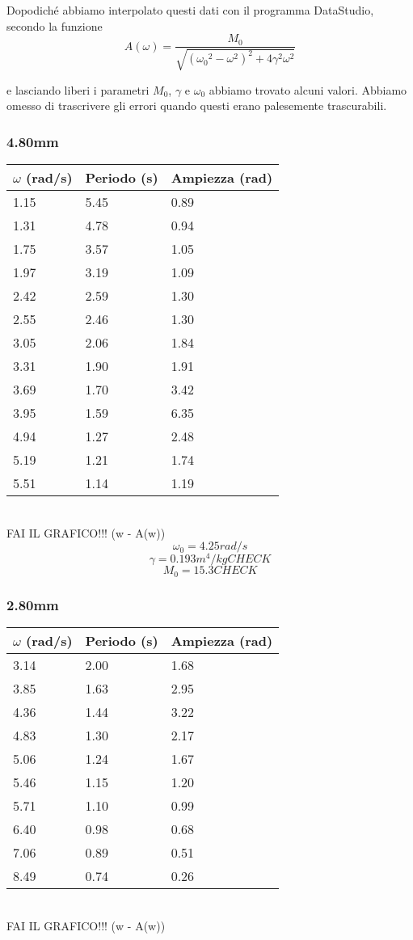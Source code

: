 \documentclass[a4paper,10pt]{report}
\begin{document}
Dopodiché abbiamo interpolato questi dati con il programma DataStudio, secondo la funzione
$$ A(\omega) = \frac{M_0}{\sqrt{ ({\omega_0}^2-\omega^2)^2 + 4\gamma^2\omega^2}} $$

e lasciando liberi i parametri $M_0$, $\gamma$ e $\omega_0$ abbiamo trovato alcuni valori. Abbiamo omesso di trascrivere gli errori quando questi erano palesemente trascurabili.
\\
\subsubsection{4.80mm}
\begin{tabular}{l|l|l}
$\omega$ (rad/s) & Periodo (s) & Ampiezza (rad) \\
\midrule
1.15	& 5.45 & 0.89\\
1.31	& 4.78 & 0.94\\
1.75	& 3.57 & 1.05\\
1.97	& 3.19 & 1.09\\
2.42	& 2.59 & 1.30\\
2.55	& 2.46 & 1.30\\
3.05    & 2.06 & 1.84\\
3.31	& 1.90 & 1.91\\
3.69	& 1.70 & 3.42\\
3.95	& 1.59 & 6.35\\
4.94	& 1.27 & 2.48\\
5.19	& 1.21 & 1.74\\
5.51	& 1.14 & 1.19 \\
\midrule
\end{tabular}
\\
FAI IL GRAFICO!!! (w - A(w))
\\

$$ \omega_0 = 4.25 rad/s $$
$$ \gamma = 0.193 m^4/kg  CHECK $$
$$ M_0 = 15.3 CHECK $$

\subsubsection{2.80mm}
\begin{tabular}{l|l|l}
$\omega$ (rad/s) & Periodo (s) & Ampiezza (rad) \\
\midrule
3.14 & 2.00 & 1.68 \\
3.85 & 1.63 & 2.95 \\
4.36 & 1.44 & 3.22 \\
4.83 & 1.30 & 2.17 \\
5.06 & 1.24 & 1.67 \\
5.46 & 1.15 & 1.20 \\
5.71 & 1.10 & 0.99 \\
6.40 & 0.98 & 0.68 \\
7.06 & 0.89 & 0.51 \\
8.49 & 0.74 & 0.26 \\
\midrule
\end{tabular}
\\
FAI IL GRAFICO!!! (w - A(w))
\\
\end{document}
